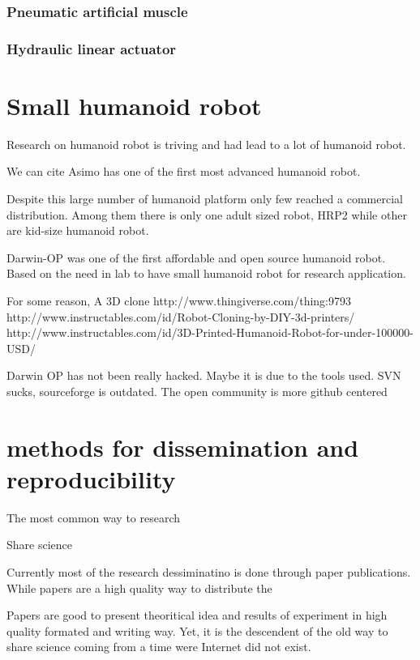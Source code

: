 \subsubsection{Pneumatic artificial muscle} %

\subsubsection{Hydraulic linear actuator} %


\section{Small humanoid robot} %
Research on humanoid robot is triving and had lead to a lot of humanoid robot.

We can cite Asimo has one of the first most advanced humanoid robot.

Despite this large number of humanoid platform only few reached a commercial distribution. Among them there is only one adult sized robot, HRP2 while other are kid-size humanoid robot.

Darwin-OP was one of the first affordable and open source humanoid robot. Based on the need in lab to have small  humanoid robot for research application.

For some reason, A 3D clone http://www.thingiverse.com/thing:9793
http://www.instructables.com/id/Robot-Cloning-by-DIY-3d-printers/
http://www.instructables.com/id/3D-Printed-Humanoid-Robot-for-under-100000-USD/

Darwin OP has not been really hacked. Maybe it is due to the tools used. SVN sucks, sourceforge is outdated.
The open community is more github centered



\section{methods for dissemination and reproducibility} %

The most common way to  research

Share science

Currently most of the research dessiminatino is done through paper publications. While papers are a high quality way to distribute the

Papers are good to present theoritical idea and results of experiment in high quality formated and writing way. Yet, it is the descendent of the old way to share science coming from a time were Internet did not exist.


